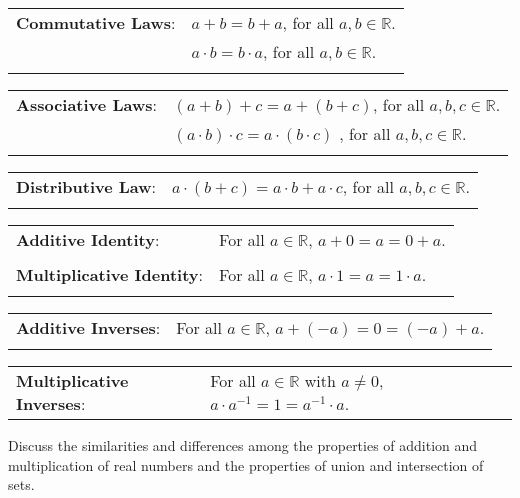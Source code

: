 \begin{activity}
\begin{flushleft}
\begin{tabular}{l l}
\textbf{Commutative Laws}:
\index{commutative laws!for real numbers}%
  &  $a+b=b+a$, for all $a,b \in \mathbb{R}$. \\
                   &  $a \cdot b=b \cdot a$, for all $a,b \in \mathbb{R}$. \\
                   &                \\
\end{tabular}
\begin{tabular}{l l}
\textbf{Associative Laws}:
\index{associative laws!for real numbers}%
     &  $\left( {a + b} \right) + c = a + \left( {b + c} \right)$, for all  $a,b,c \in \mathbb{R}$.  \\
                   &  $\left( {a \cdot b} \right) \cdot c = a \cdot \left( {b \cdot c} \right)$
, for all  $a,b,c \in \mathbb{R}$.  \\
                   &  \\
\end{tabular}
\begin{tabular}{l l}
\textbf{Distributive Law}:
\index{distributive laws!for real numbers}%
  &  $a \cdot \left( {b + c} \right) = a \cdot b + a \cdot c$, for all  $a,b,c \in \mathbb{R}$.  \\
                   & \\
\end{tabular}
\begin{tabular}{l l}
\textbf{Additive Identity}:
\index{additive identity}%
 &  For all  $a \in \mathbb{R}$, $a + 0 = a = 0 + a$.  \\
                  &  \\
\textbf{Multiplicative Identity}:
\index{multiplicative identity}%
  &  For all  $a \in \mathbb{R}$, $a \cdot 1 = a = 1 \cdot a$.  \\
                 &  \\
\end{tabular}
\begin{tabular}{l l}
\textbf{Additive Inverses}:
\index{additive inverse}%
  &  For all  $a \in \mathbb{R}$, $a + ( - a) = 0 = ( - a) + a$.  \\
                 &  \\
\end{tabular}
\begin{tabular}{l l}
\textbf{Multiplicative Inverses}:
\index{multiplicative inverse}%
  &  For all  $a \in \mathbb{R}$ with  $a \ne 0$, $a \cdot a^{ - 1}  = 1 = a^{ - 1}  \cdot a$.\\
\end{tabular}
\end{flushleft}

Discuss the similarities and differences among the properties of addition and multiplication of real numbers and the properties of union and intersection of sets.
\end{activity}
\hbreak





\endinput
